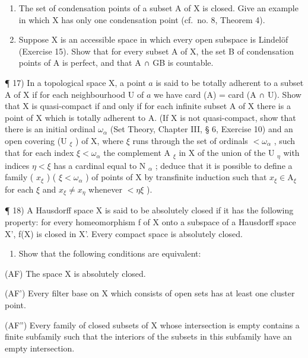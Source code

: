 \begin{enumerate}
\def\labelenumi{\alph{enumi})}
\item
  The set of condensation points of a subset A of X is closed. Give an example in which X has only one condensation point (cf.~no. 8, Theorem 4).
\item
  Suppose X is an accessible space in which every open subspace is Lindelöf (Exercise 15). Show that for every subset A of X, the set B of condensation points of A is perfect, and that A ∩ GB is countable.
\end{enumerate}

¶ 17) In a topological space X, a point \(a\) is said to be totally adherent to a subset A of X if for each neighbourhood U of \(a\) we have card (A) = card (A ∩ U). Show that X is quasi-compact if and only if for each infinite subset A of X there is a point of X which is totally adherent to A. (If X is not quasi-compact, show that there is an initial ordinal \(\omega_{\alpha}\) (Set Theory, Chapter III, § 6, Exercise 10) and an open covering (U \(_{\xi}\) ) of X, where \(\xi\) runs through the set of ordinals \(<\omega_{\alpha}\) , such that for each index \(\xi<\omega_{\alpha}\) the complement A \(_{\xi}\) in X of the union of the U \(_{\eta}\) with indices \(\eta<\xi\) has a cardinal equal to N \(_{\alpha}\) ; deduce that it is possible to define a family ( \(x_{\xi}\) ) ( \(\xi<\omega_{\alpha}\) ) of points of X by transfinite induction such that \(x_{\xi}\in\mathrm{A}_{\xi}\) for each \(\xi\) and \(x_{\xi}\neq x_{\eta}\) whenever \(<\eta\xi\) ).

¶ 18) A Hausdorff space X is said to be absolutely closed if it has the following property: for every homeomorphism f of X onto a subspace of a Hausdorff space X', f(X) is closed in X'. Every compact space is absolutely closed.

\begin{enumerate}
\def\labelenumi{\alph{enumi})}
\tightlist
\item
  Show that the following conditions are equivalent:
\end{enumerate}

(AF) The space X is absolutely closed.

(AF') Every filter base on X which consists of open sets has at least one cluster point.

(AF'') Every family of closed subsets of X whose intersection is empty contains a finite subfamily such that the interiors of the subsets in this subfamily have an empty intersection.

